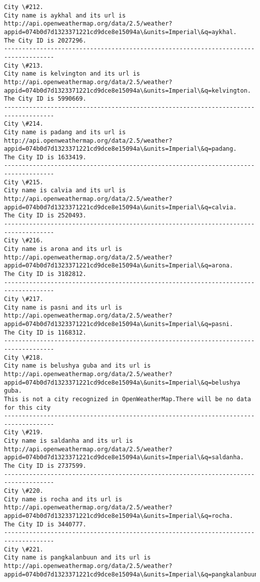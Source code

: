 \documentclass[11pt]{article}
\begin{document}
\begin{Verbatim}[commandchars=\\\{\}]
City \#212.
City name is aykhal and its url is http://api.openweathermap.org/data/2.5/weather?appid=074b0d7d1323371221cd9dce8e15094a\&units=Imperial\&q=aykhal.
The City ID is 2027296.
------------------------------------------------------------------------------------
City \#213.
City name is kelvington and its url is http://api.openweathermap.org/data/2.5/weather?appid=074b0d7d1323371221cd9dce8e15094a\&units=Imperial\&q=kelvington.
The City ID is 5990669.
------------------------------------------------------------------------------------
City \#214.
City name is padang and its url is http://api.openweathermap.org/data/2.5/weather?appid=074b0d7d1323371221cd9dce8e15094a\&units=Imperial\&q=padang.
The City ID is 1633419.
------------------------------------------------------------------------------------
City \#215.
City name is calvia and its url is http://api.openweathermap.org/data/2.5/weather?appid=074b0d7d1323371221cd9dce8e15094a\&units=Imperial\&q=calvia.
The City ID is 2520493.
------------------------------------------------------------------------------------
City \#216.
City name is arona and its url is http://api.openweathermap.org/data/2.5/weather?appid=074b0d7d1323371221cd9dce8e15094a\&units=Imperial\&q=arona.
The City ID is 3182812.
------------------------------------------------------------------------------------
City \#217.
City name is pasni and its url is http://api.openweathermap.org/data/2.5/weather?appid=074b0d7d1323371221cd9dce8e15094a\&units=Imperial\&q=pasni.
The City ID is 1168312.
------------------------------------------------------------------------------------
City \#218.
City name is belushya guba and its url is http://api.openweathermap.org/data/2.5/weather?appid=074b0d7d1323371221cd9dce8e15094a\&units=Imperial\&q=belushya guba.
This is not a city recognized in OpenWeatherMap.There will be no data for this city
------------------------------------------------------------------------------------
City \#219.
City name is saldanha and its url is http://api.openweathermap.org/data/2.5/weather?appid=074b0d7d1323371221cd9dce8e15094a\&units=Imperial\&q=saldanha.
The City ID is 2737599.
------------------------------------------------------------------------------------
City \#220.
City name is rocha and its url is http://api.openweathermap.org/data/2.5/weather?appid=074b0d7d1323371221cd9dce8e15094a\&units=Imperial\&q=rocha.
The City ID is 3440777.
------------------------------------------------------------------------------------
City \#221.
City name is pangkalanbuun and its url is http://api.openweathermap.org/data/2.5/weather?appid=074b0d7d1323371221cd9dce8e15094a\&units=Imperial\&q=pangkalanbuun.

\end{Verbatim}
\end{document}
